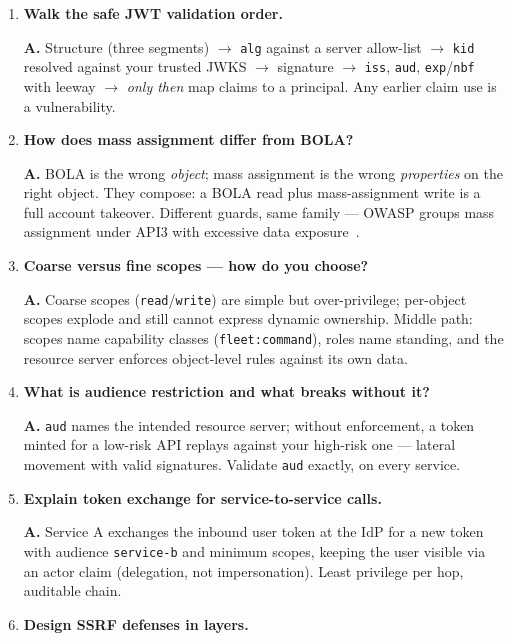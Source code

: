\begin{enumerate}[label=\textbf{Q\arabic*.}, leftmargin=1.7cm, itemsep=0.9em, start=11]
  \item \textbf{Walk the safe JWT validation order.}\par
        \textbf{A.} Structure (three segments) $\to$ \texttt{alg} against a
        server allow-list $\to$ \texttt{kid} resolved against your trusted
        JWKS $\to$ signature $\to$ \texttt{iss}, \texttt{aud},
        \texttt{exp}/\texttt{nbf} with leeway $\to$ \emph{only then} map
        claims to a principal. Any earlier claim use is a vulnerability.
  \item \textbf{How does mass assignment differ from BOLA?}\par
        \textbf{A.} BOLA is the wrong \emph{object}; mass assignment is
        the wrong \emph{properties} on the right object. They compose: a
        BOLA read plus mass-assignment write is a full account takeover.
        Different guards, same family --- OWASP groups mass assignment
        under API3 with excessive data exposure~\cite{owaspapisecurity}.
  \item \textbf{Coarse versus fine scopes --- how do you choose?}\par
        \textbf{A.} Coarse scopes (\texttt{read}/\texttt{write}) are simple
        but over-privilege; per-object scopes explode and still cannot
        express dynamic ownership. Middle path: scopes name capability
        classes (\texttt{fleet:command}), roles name standing, and the
        resource server enforces object-level rules against its own data.
  \item \textbf{What is audience restriction and what breaks without
        it?}\par
        \textbf{A.} \texttt{aud} names the intended resource server;
        without enforcement, a token minted for a low-risk API replays
        against your high-risk one --- lateral movement with valid
        signatures. Validate \texttt{aud} exactly, on every service.
  \item \textbf{Explain token exchange for service-to-service calls.}\par
        \textbf{A.} Service A exchanges the inbound user token at the IdP
        for a new token with audience \texttt{service-b} and minimum
        scopes, keeping the user visible via an actor claim (delegation,
        not impersonation). Least privilege per hop, auditable chain.
  \item \textbf{Design SSRF defenses in layers.}\par

\end{enumerate}
